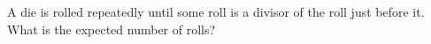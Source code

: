 A die is rolled repeatedly until some roll is a divisor of the roll just before it. What is the expected number of rolls?
